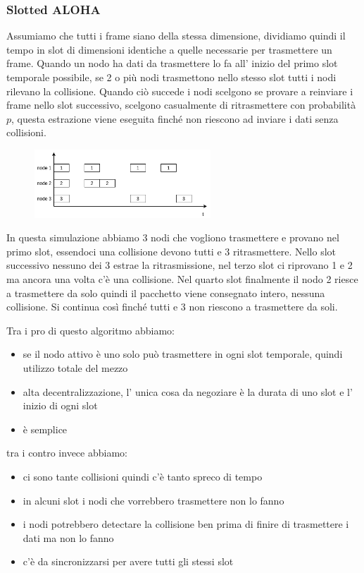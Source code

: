 \subsubsection{Slotted ALOHA}
Assumiamo che tutti i frame siano della stessa dimensione, dividiamo quindi il tempo in slot di dimensioni identiche a quelle necessarie per trasmettere un frame.
Quando un nodo ha dati da trasmettere lo fa all' inizio del primo slot temporale possibile, se 2 o più nodi trasmettono nello stesso slot tutti i nodi rilevano la collisione.
Quando ciò succede i nodi scelgono se provare a reinviare i frame nello slot successivo, scelgono casualmente di ritrasmettere con probabilità $p$, questa estrazione viene eseguita finché non riescono ad inviare i dati senza collisioni.
\begin{figure}[H]
    \centering
    \includegraphics[width=250px]{images/3_Reti_connessione_diretta/slotted_aloha.png}
\end{figure}
In questa simulazione abbiamo 3 nodi che vogliono trasmettere e provano nel primo slot, essendoci una collisione devono tutti e 3 ritrasmettere.
Nello slot successivo nessuno dei 3 estrae la ritrasmissione, nel terzo slot ci riprovano 1 e 2 ma ancora una volta c'è una collisione.
Nel quarto slot finalmente il nodo 2 riesce a trasmettere da solo quindi il pacchetto viene consegnato intero, nessuna collisione.
Si continua così finché tutti e 3 non riescono a trasmettere da soli.

Tra i pro di questo algoritmo abbiamo:
\begin{itemize}
    \item se il nodo attivo è uno solo può trasmettere in ogni slot temporale, quindi utilizzo totale del mezzo
    \item alta decentralizzazione, l' unica cosa da negoziare è la durata di uno slot e l' inizio di ogni slot
    \item è semplice
\end{itemize}
tra i contro invece abbiamo:
\begin{itemize}
    \item ci sono tante collisioni quindi c'è tanto spreco di tempo
    \item in alcuni slot i nodi che vorrebbero trasmettere non lo fanno
    \item i nodi potrebbero detectare la collisione ben prima di finire di trasmettere i dati ma non lo fanno
    \item c'è da sincronizzarsi per avere tutti gli stessi slot
\end{itemize}

